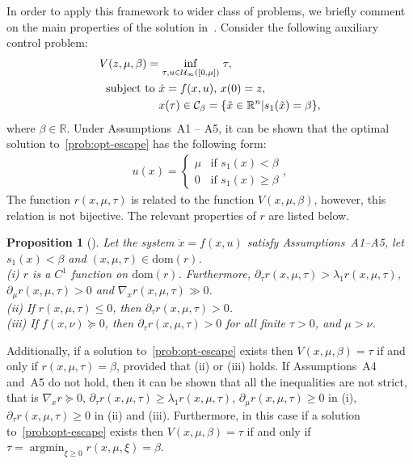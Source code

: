 \documentclass[letterpaper, 10pt, journal]{IEEEtran}  %
\newcommand{\R}{{\mathbb R}}
\newcommand{\cC}{{\mathcal C}}
\newcommand{\cU}{{\mathcal U}}
\newcommand{\argmin}{\mathop{\mathrm{argmin}}}
\newcommand{\dom}{\mathrm{dom}}
\newtheorem{prop}{Proposition}
\begin{document}
In order to apply this framework to wider class of problems, we briefly comment on the main properties of the solution in~\cite{sootla2016optimalswitching}. Consider the following auxiliary control problem:
\begin{align}
V(z, \mu, \beta) = &\inf\limits_{\begin{smallmatrix} \tau, u \in \cU_\infty([0,\mu]) \end{smallmatrix}}  \tau, \label{prob:opt-escape} \\
\notag \text{ subject to~} &\dot x =f(x, u),\, x(0) = z,\, \\ 
\notag &x(\tau) \in \cC_\beta = \{\tilde x \in \R^n | s_1(\tilde x) = \beta \},
\end{align}
where $\beta\in\R$. Under Assumptions~A1 -- A5, it can be shown that the optimal solution to~\eqref{prob:opt-escape} has the following form:
\begin{gather}
u(x) = \begin{cases}
\mu    &  \text{if } s_1(x) < \beta\\
0      &  \text{if }s_1(x) \ge \beta
\end{cases},\label{pulse:closed-loop-escape}
\end{gather}
The function $r(x,\mu,\tau)$ is related to the function $V(x,\mu,\beta)$, however, this relation is not bijective. The relevant properties of $r$ are listed below.

\begin{prop}[\cite{sootla2016optimalswitching}]\label{thm:r-prop}
	Let the system $\dot x =f(x, u)$ satisfy Assumptions~{A1--A5}, let $s_1(x)<\beta$ and $(x,\mu,\tau)\in\dom(r)$.  \\
	(i) $r$ is a $C^1$ function on $\dom(r)$. Furthermore, $\partial_\tau r(x,\mu,\tau) > \lambda_1 r(x,\mu,\tau)$,   $\partial_\mu r(x,\mu,\tau) > 0$  and $\nabla_x    r(x,\mu,\tau) \gg 0$.\\
	(ii) If $r(x,\mu,\tau)\le 0$, then $\partial_\tau r(x,\mu,\tau)> 0$.\\
	(iii) If $f(x, \nu)\succeq 0$, then $\partial_\tau r(x,\mu,\tau)>0$ for all finite $\tau> 0$, and $\mu > \nu$.
\end{prop}

Additionally, if a solution to~\eqref{prob:opt-escape} exists then $V(x, \mu, \beta) = \tau$  if and only if $r(x,\mu,\tau) = \beta$, provided that (ii) or (iii) holds. If Assumptions~{A4} and~{A5} do not hold, then it can be shown that all the inequalities are not strict, that is $\nabla_x r\succeq 0$, $\partial_\tau r(x,\mu,\tau) \ge \lambda_1 r(x,\mu,\tau)$, $\partial_\mu r(x,\mu,\tau) \ge 0$ in (i), $\partial_\tau r(x,\mu,\tau) \ge 0$ in (ii) and (iii). Furthermore, in this case if a solution to~\eqref{prob:opt-escape} exists then $V(x, \mu, \beta) = \tau$  if and only if $\tau = \argmin_{\xi\ge 0} r(x,\mu,\xi) = \beta$.
\end{document}
